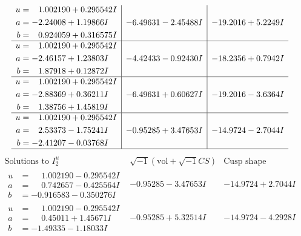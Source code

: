 \documentclass[1p]{elsarticle_modified}
\theoremstyle{definition}
\newcommand{\I}{\sqrt{-1}}
\begin{document}
$$\begin{array}{c|c|c}
\begin{aligned}
u &= \phantom{-}1.002190 + 0.295542 I \\
a &= -2.24008 + 1.19866 I \\
b &= \phantom{-}0.924059 + 0.316575 I\end{aligned}
 & -6.49631 - 2.45488 I & -19.2016 + 5.2249 I \\ \hline\begin{aligned}
u &= \phantom{-}1.002190 + 0.295542 I \\
a &= -2.46157 + 1.23803 I \\
b &= \phantom{-}1.87918 + 0.12872 I\end{aligned}
 & -4.42433 - 0.92430 I & -18.2356 + 0.7942 I \\ \hline\begin{aligned}
u &= \phantom{-}1.002190 + 0.295542 I \\
a &= -2.88369 + 0.36211 I \\
b &= \phantom{-}1.38756 + 1.45819 I\end{aligned}
 & -6.49631 + 0.60627 I & -19.2016 - 3.6364 I \\ \hline\begin{aligned}
u &= \phantom{-}1.002190 + 0.295542 I \\
a &= \phantom{-}2.53373 - 1.75241 I \\
b &= -2.41207 - 0.03768 I\end{aligned}
 & -0.95285 + 3.47653 I & -14.9724 - 2.7044 I\\
 \hline 
 \end{array}$$\newpage$$\begin{array}{c|c|c}  
\text{Solutions to }I^u_{2}& \I (\text{vol} + \sqrt{-1}CS) & \text{Cusp shape}\\
 \hline 
\begin{aligned}
u &= \phantom{-}1.002190 - 0.295542 I \\
a &= \phantom{-}0.742657 - 0.425564 I \\
b &= -0.916583 - 0.350276 I\end{aligned}
 & -0.95285 - 3.47653 I & -14.9724 + 2.7044 I \\ \hline\begin{aligned}
u &= \phantom{-}1.002190 - 0.295542 I \\
a &= \phantom{-}0.45011 + 1.45671 I \\
b &= -1.49335 - 1.18033 I\end{aligned}
 & -0.95285 + 5.32514 I & -14.9724 - 4.2928 I \\ \hline\begin{aligned}

\end{aligned}
\end{array}$$
\end{document}
